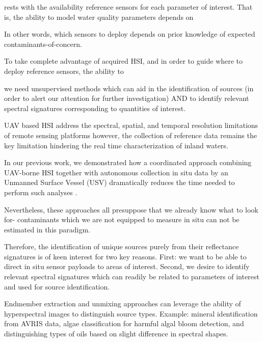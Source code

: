 \documentclass{article}
\begin{document}
rests with the availability reference sensors for each parameter of interest. That is, the ability to model water quality parameters depends on 


In other words, which sensors to deploy depends on prior knowledge of expected contaminants-of-concern.


To take complete advantage of acquired HSI, and in order to guide where to deploy reference sensors, the ability to 

we need unsupervised methods which can aid in the identification of sources (in order to alert our attention for further investigation) AND to identify relevant spectral signatures corresponding to quantities of interest. 

UAV based HSI address the spectral, spatial, and temporal resolution limitations of remote sensing platforms however, the collection of reference data remains the key limitation hindering the real time characterization of inland waters. 

In our previous work, we demonstrated how a coordinated approach combining UAV-borne HSI together with autonomous collection in situ data by an Unmanned Surface Vessel (USV) dramatically reduces the time needed to perform such analyses \cite{robot-team-1, robot-team-2}. 

Nevertheless, these approaches all presuppose that we already know what to look for- contaminants which we are not equipped to measure in situ can not be estimated in this paradigm. 

Therefore, the identification of unique sources purely from their reflectance signatures is of keen interest for two key reasons. First: we want to be able to direct in situ sensor payloads to areas of interest. Second, we desire to identify relevant spectral signatures which can readily be related to parameters of interest and used for source identification.


Endmember extraction and unmixing approaches can leverage the ability of hyperspectral images to distinguish source types. Example: mineral identification from AVRIS data, algae classification for harmful algal bloom detection, and distinguishing types of oils based on slight difference in spectral shapes.
\end{document}
